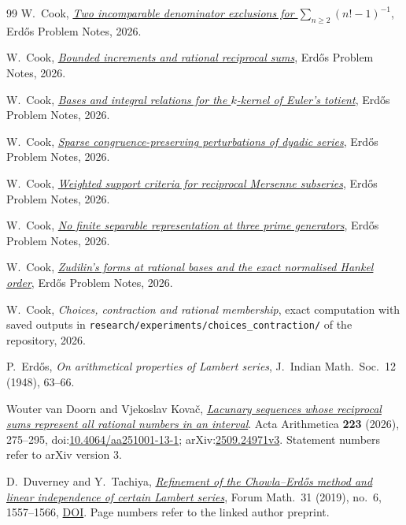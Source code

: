 \documentclass[11pt]{article}
\begin{document}
\begin{thebibliography}{99}
 W.~Cook,
  \href{erdos-68-factorial-denominator-irrationality.pdf}{\emph{Two
  incomparable denominator exclusions for $\sum_{n\ge2}(n!-1)^{-1}$}},
  Erd\H{o}s Problem Notes, 2026.

 W.~Cook,
  \href{erdos-243-reciprocal-tail-rigidity.pdf}{\emph{Bounded
  increments and rational reciprocal sums}}, Erd\H{o}s Problem Notes, 2026.

 W.~Cook,
  \href{erdos-249-binary-totient-series.pdf}{\emph{Bases and
  integral relations for the $k$-kernel of Euler's totient}}, Erd\H{o}s Problem
  Notes, 2026.

 W.~Cook,
  \href{erdos-251-prime-gap-dyadic-series.pdf}{\emph{Sparse
  congruence-preserving perturbations of dyadic series}}, Erd\H{o}s Problem
  Notes, 2026.

 W.~Cook,
  \href{erdos-257-mersenne-support-subseries.pdf}{\emph{Weighted
  support criteria for reciprocal Mersenne subseries}}, Erd\H{o}s Problem Notes,
  2026.

 W.~Cook,
  \href{erdos-269-three-prime-running-lcm.pdf}{\emph{No
  finite separable representation at three prime generators}}, Erd\H{o}s Problem
  Notes, 2026.

 W.~Cook,
  \href{erdos-1049-rational-base-lambert.pdf}{\emph{Zudilin's
  forms at rational bases and the exact normalised Hankel order}}, Erd\H{o}s
  Problem Notes, 2026.

 W.~Cook,
  \emph{Choices, contraction and rational membership}, exact computation with saved outputs in \texttt{research/experiments/choices\_contraction/} of the repository,
  2026.

 P.~Erd\H{o}s, \emph{On arithmetical properties of Lambert
  series}, J.~Indian Math.\ Soc.\ 12 (1948), 63--66.

 Wouter van Doorn and Vjekoslav Kova\v{c}, \href{https://arxiv.org/abs/2509.24971v3}{\emph{Lacunary sequences whose reciprocal sums represent all rational numbers in an interval}}.
  Acta Arithmetica \textbf{223} (2026), 275--295, doi:\href{https://doi.org/10.4064/aa251001-13-1}{10.4064/aa251001-13-1}; arXiv:\href{https://arxiv.org/abs/2509.24971v3}{2509.24971v3}. Statement numbers refer to arXiv version 3.

 D.~Duverney and Y.~Tachiya,
  \href{https://danielduverney.fr/documents/theorie-des-nombres/DuverneyTachiya190522.pdf}
  {\emph{Refinement of the Chowla--Erd\H{o}s method and linear independence
  of certain Lambert series}},
  Forum Math.\ 31 (2019), no.~6, 1557--1566,
  \href{https://doi.org/10.1515/forum-2018-0299}{DOI}.  Page numbers refer to
  the linked author preprint.


\end{thebibliography}
\end{document}
